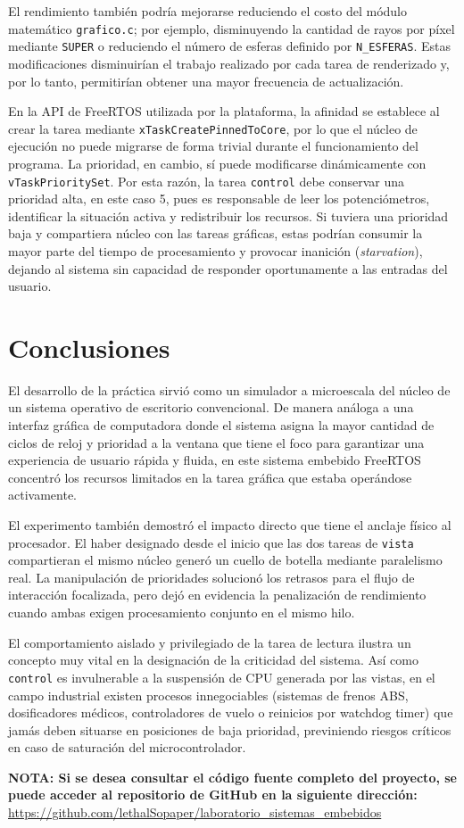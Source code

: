 \documentclass[12pt, letterpaper]{article}
\begin{document}
El rendimiento también podría mejorarse reduciendo el costo del módulo matemático \texttt{grafico.c}; por ejemplo, disminuyendo la cantidad de rayos por píxel mediante \texttt{SUPER} o reduciendo el número de esferas definido por \texttt{N\_ESFERAS}. Estas modificaciones disminuirían el trabajo realizado por cada tarea de renderizado y, por lo tanto, permitirían obtener una mayor frecuencia de actualización.

En la API de FreeRTOS utilizada por la plataforma, la afinidad se establece al crear la tarea mediante \texttt{xTaskCreatePinnedToCore}, por lo que el núcleo de ejecución no puede migrarse de forma trivial durante el funcionamiento del programa. La prioridad, en cambio, sí puede modificarse dinámicamente con \texttt{vTaskPrioritySet}. Por esta razón, la tarea \texttt{control} debe conservar una prioridad alta, en este caso 5, pues es responsable de leer los potenciómetros, identificar la situación activa y redistribuir los recursos. Si tuviera una prioridad baja y compartiera núcleo con las tareas gráficas, estas podrían consumir la mayor parte del tiempo de procesamiento y provocar inanición (\textit{starvation}), dejando al sistema sin capacidad de responder oportunamente a las entradas del usuario.

\section*{\centering \fontsize{16}{17}\sffamily\selectfont Conclusiones}

El desarrollo de la práctica sirvió como un simulador a microescala del núcleo de un sistema operativo de escritorio convencional. De manera análoga a una interfaz gráfica de computadora donde el sistema asigna la mayor cantidad de ciclos de reloj y prioridad a la ventana que tiene el foco para garantizar una experiencia de usuario rápida y fluida, en este sistema embebido FreeRTOS concentró los recursos limitados en la tarea gráfica que estaba operándose activamente.

El experimento también demostró el impacto directo que tiene el anclaje físico al procesador. El haber designado desde el inicio que las dos tareas de \texttt{vista} compartieran el mismo núcleo generó un cuello de botella mediante paralelismo real. La manipulación de prioridades solucionó los retrasos para el flujo de interacción focalizada, pero dejó en evidencia la penalización de rendimiento cuando ambas exigen procesamiento conjunto en el mismo hilo.

El comportamiento aislado y privilegiado de la tarea de lectura ilustra un concepto muy vital en la designación de la criticidad del sistema. Así como \texttt{control} es invulnerable a la suspensión de CPU generada por las vistas, en el campo industrial existen procesos innegociables (sistemas de frenos ABS, dosificadores médicos, controladores de vuelo o reinicios por watchdog timer) que jamás deben situarse en posiciones de baja prioridad, previniendo riesgos críticos en caso de saturación del microcontrolador.

\newpage
\textbf{NOTA: Si se desea consultar el código fuente completo del proyecto, se puede acceder al repositorio de GitHub en la siguiente dirección:} \url{https://github.com/lethalSopaper/laboratorio_sistemas_embebidos}
\end{document}
